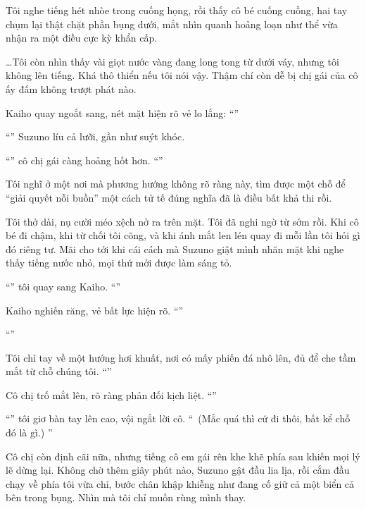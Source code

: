 \documentclass[../main.tex]{subfiles}
\begin{document}
Tôi nghe tiếng hét nhòe trong cuống họng, rồi thấy cô bé cuống cuồng, hai tay chụm lại thật chặt phần bụng dưới, mắt nhìn quanh hoảng loạn như thể vừa nhận ra một điều cực kỳ khẩn cấp.

\dots Tôi còn nhìn thấy vài giọt nước vàng đang long tong từ dưới váy, nhưng tôi không lên tiếng. Khá thô thiển nếu tôi nói vậy. Thậm chí còn dễ bị chị gái của cô ấy đấm không trượt phát nào.

Kaiho quay ngoắt sang, nét mặt hiện rõ vẻ lo lắng: ``''

``'' Suzuno líu cả lưỡi, gần như suýt khóc.

``'' cô chị gái càng hoảng hốt hơn. ``''

Tôi nghĩ ở một nơi mà phương hướng không rõ ràng này, tìm được một chỗ để ``giải quyết nỗi buồn'' một cách tử tế đúng nghĩa đã là điều bất khả thi rồi.

Tôi thở dài, nụ cười méo xệch nở ra trên mặt. Tôi đã nghi ngờ từ sớm rồi. Khi cô bé đi chậm, khi từ chối tôi cõng, và khi ánh mắt len lén quay đi mỗi lần tôi hỏi gì đó riêng tư. Mãi cho tới khi cái cách mà Suzuno giật mình nhăn mặt khi nghe thấy tiếng nước nhỏ, mọi thứ mới được làm sáng tỏ.

``'' tôi quay sang Kaiho. ``''

Kaiho nghiến răng, vẻ bất lực hiện rõ. ``''

``''

Tôi chỉ tay về một hướng hơi khuất, nơi có mấy phiến đá nhô lên, đủ để che tầm mắt từ chỗ chúng tôi. ``''

Cô chị trố mắt lên, rõ ràng phản đối kịch liệt. ``''

``'' tôi giơ bàn tay lên cao, vội ngắt lời cô. ``\ (Mắc quá thì cứ đi thôi, bất kể chỗ đó là gì.) ''

Cô chị còn định cãi nữa, nhưng tiếng cô em gái rên khe khẽ phía sau khiến mọi lý lẽ dừng lại. Không chờ thêm giây phút nào, Suzuno gật đầu lia lịa, rồi cắm đầu chạy về phía tôi vừa chỉ, bước chân khập khiễng như đang cố giữ cả một biển cả bên trong bụng. Nhìn mà tôi chỉ muốn rùng mình thay.
\end{document}
